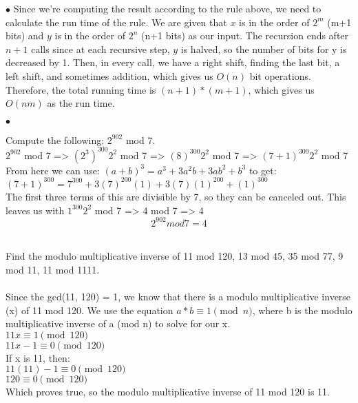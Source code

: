 \documentclass{article}
\newenvironment{myitem}{\begin{list}{$\bullet$}
{\setlength{\itemsep}{-0pt}
\setlength{\topsep}{0pt}
\setlength{\labelwidth}{0pt}
\setlength{\leftmargin}{10pt}
\setlength{\parsep}{-0pt}
\setlength{\itemsep}{0pt}
\setlength{\partopsep}{0pt}}}%
{\end{list}}
\begin{document}
\begin{myitem}
Since we're computing the result according to the rule above, we need to calculate the run time of the rule. We are given that $x$ is in the order of $2^m$ (m+1 bits) and $y$ is in the order of $2^n$ (n+1 bits) as our input. The recursion ends after $n+1$ calls since at each recursive step, $y$ is halved, so the number of bits for y is decreased by 1. Then, in every call, we have a right shift, finding the last bit, a left shift, and sometimes addition, which gives us $O(n)$ bit operations. Therefore, the total running time is $(n+1)*(m+1)$, which gives us $O(nm)$ as the run time.\\
\end{myitem}

\begin{myitem}
\item Compute the following: $2^{902}$ mod 7.\\

$2^{902}$ mod 7 => $(2^{3})^{300}2^{2}$ mod 7 => $(8)^{300}2^{2}$ mod 7
=> $(7+1)^{300}2^{2}$ mod 7\\
From here we can use:  $(a+b)^{3} = a^{3} + 3a^{2}b + 3ab^{2} + b^{3}$ to get:\\
$(7+1)^{300} = 7^{300} + 3(7)^{200}(1) + 3(7)(1)^{200} + (1)^{300}$\\
The first three terms of this are divisible by 7, so they can be canceled out.
This leaves us with $1^{300}2^{2}$ mod 7 => 4 mod 7 => 4\\
$$2^{902} mod 7 = 4$$\\

\item Find the modulo multiplicative inverse of 11 mod 120, 13 mod 45,
  35 mod 77, 9 mod 11, 11 mod 1111.\\

\\
Since the gcd(11, 120) = 1, we know that there is a modulo multiplicative inverse
(x) of 11 mod 120. We use the equation $a*b \equiv 1 \pmod{n}$, where b is the
modulo multiplicative inverse of a (mod n) to solve for our x.\\
$11x \equiv 1 \pmod{120}$\\
$11x - 1  \equiv 0 \pmod{120}$\\
If x is 11, then:\\
$11(11)-1 \equiv 0 \pmod{120}$\\
$120 \equiv 0 \pmod{120}$\\
Which proves true, so the modulo multiplicative inverse of 11 mod 120 is 11.\\


\end{myitem}
\end{document}
